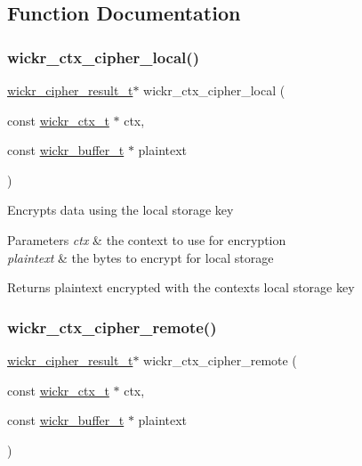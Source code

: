 \subsection{Function Documentation}
\mbox{\label{group__wickr__ctx_gaeff6704dded2d44f689eca5ad25843f8}} 
\subsubsection{\texorpdfstring{wickr\+\_\+ctx\+\_\+cipher\+\_\+local()}{wickr\_ctx\_cipher\_local()}}
{\footnotesize\ttfamily \mbox{\hyperlink{structwickr__cipher__result}{wickr\+\_\+cipher\+\_\+result\+\_\+t}}$\ast$ wickr\+\_\+ctx\+\_\+cipher\+\_\+local (\begin{DoxyParamCaption}\item[{const \mbox{\hyperlink{structwickr__ctx}{wickr\+\_\+ctx\+\_\+t}} $\ast$}]{ctx,  }\item[{const \mbox{\hyperlink{structwickr__buffer}{wickr\+\_\+buffer\+\_\+t}} $\ast$}]{plaintext }\end{DoxyParamCaption})}

Encrypts data using the local storage key


\begin{DoxyParams}{Parameters}
{\em ctx} & the context to use for encryption \\
\hline
{\em plaintext} & the bytes to encrypt for local storage \\
\hline
\end{DoxyParams}
\begin{DoxyReturn}{Returns}
\textquotesingle{}plaintext\textquotesingle{} encrypted with the context\textquotesingle{}s local storage key 
\end{DoxyReturn}
\mbox{\label{group__wickr__ctx_ga0b985fb2cd05fb482b5ed175dfd650a0}} 
\subsubsection{\texorpdfstring{wickr\+\_\+ctx\+\_\+cipher\+\_\+remote()}{wickr\_ctx\_cipher\_remote()}}
{\footnotesize\ttfamily \mbox{\hyperlink{structwickr__cipher__result}{wickr\+\_\+cipher\+\_\+result\+\_\+t}}$\ast$ wickr\+\_\+ctx\+\_\+cipher\+\_\+remote (\begin{DoxyParamCaption}\item[{const \mbox{\hyperlink{structwickr__ctx}{wickr\+\_\+ctx\+\_\+t}} $\ast$}]{ctx,  }\item[{const \mbox{\hyperlink{structwickr__buffer}{wickr\+\_\+buffer\+\_\+t}} $\ast$}]{plaintext }\end{DoxyParamCaption})}

